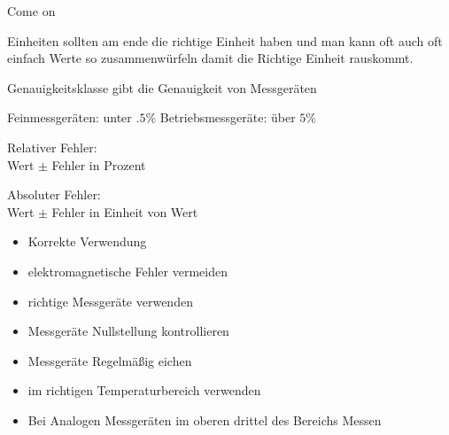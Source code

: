 \documentclass[letterpaper,10pt,english]{jupyterBook}
\begin{document}
\sphinxAtStartPar
Come on

\sphinxAtStartPar
Einheiten sollten am ende die richtige Einheit haben
und man kann oft auch oft einfach Werte so zusammenwürfeln damit die Richtige Einheit rauskommt.

\begin{DUlineblock}{0em}
\item[] 
\end{DUlineblock}

\sphinxAtStartPar
Genauigkeitsklasse gibt die Genauigkeit von Messgeräten

\sphinxAtStartPar
Feinmessgeräten: unter \(.5\%\)
Betriebsmessgeräte: über \(5\%\)

\begin{DUlineblock}{0em}
\item[] 
\end{DUlineblock}

\sphinxAtStartPar
Relativer Fehler:\\
Wert \(\pm\) Fehler in Prozent

\sphinxAtStartPar
Absoluter Fehler:\\
Wert \(\pm\) Fehler in Einheit von Wert

\begin{DUlineblock}{0em}
\item[] 
\end{DUlineblock}
\begin{itemize}
\item {} 
\sphinxAtStartPar
Korrekte Verwendung

\item {} 
\sphinxAtStartPar
elektromagnetische Fehler vermeiden

\item {} 
\sphinxAtStartPar
richtige Messgeräte verwenden

\item {} 
\sphinxAtStartPar
Messgeräte Nullstellung kontrollieren

\item {} 
\sphinxAtStartPar
Messgeräte Regelmäßig eichen

\item {} 
\sphinxAtStartPar
im richtigen Temperaturbereich verwenden

\item {} 
\sphinxAtStartPar
Bei Analogen Messgeräten im oberen drittel des Bereichs Messen

\end{itemize}
\end{document}
